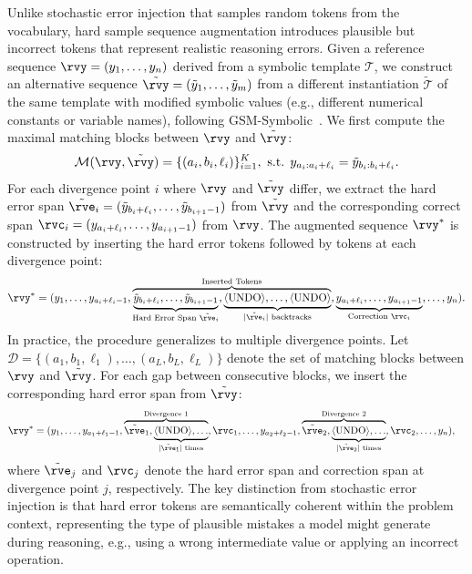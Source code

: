 Unlike stochastic error injection that samples random tokens from the vocabulary, hard sample sequence augmentation introduces plausible but incorrect tokens that represent realistic reasoning errors.
Given a reference sequence $\rvy = (y_1, \ldots, y_n)$ derived from a symbolic template $\mathcal{T}$, we construct an alternative sequence $\tilde{\rvy} = (\tilde{y}_1, \ldots, \tilde{y}_m)$ from a different instantiation $\tilde{\mathcal{T}}$ of the same template with modified symbolic values (e.g., different numerical constants or variable names), following GSM-Symbolic~\cite{mirzadeh2024gsm}.
We first compute the maximal matching blocks between $\rvy$ and $\tilde{\rvy}$:
\begin{align}
    \mathcal{M}(\rvy, \tilde{\rvy}) = \{(a_i, b_i, \ell_i)\}_{i=1}^{K}, \text{ s.t. } y_{a_i : a_i + \ell_i} = \tilde{y}_{b_i : b_i + \ell_i}.
\end{align}
For each divergence point $i$ where $\rvy$ and $\tilde{\rvy}$ differ, we extract the hard error span $\tilde{\rve}_i = (\tilde{y}_{b_i + \ell_i}, \ldots, \tilde{y}_{b_{i+1} - 1})$ from $\tilde{\rvy}$ and the corresponding correct span $\rvc_i = (y_{a_i + \ell_i}, \ldots, y_{a_{i+1} - 1})$ from $\rvy$.
The augmented sequence $\rvy^*$ is constructed by inserting the hard error tokens followed by tokens \bk at each divergence point:
\begin{align}
    \rvy^* = (y_1, \ldots, y_{a_i + \ell_i - 1}, \overbrace{\underbrace{\tilde{y}_{b_i + \ell_i}, \ldots, \tilde{y}_{b_{i+1} - 1}}_{\text{Hard Error Span } \tilde{\rve}_i}, \underbrace{\bk, \ldots, \bk}_{\text{$|\tilde{\rve}_i|$ backtracks}}}^{\text{Inserted Tokens}}, \underbrace{y_{a_i + \ell_i}, \ldots, y_{a_{i+1} - 1}}_{\text{Correction } \rvc_i}, \ldots, y_n).
\end{align}
In practice, the procedure generalizes to multiple divergence points. Let $\mathcal{D} = \{(a_1, b_1, \ell_1), \ldots, (a_L, b_L, \ell_L)\}$ denote the set of matching blocks between $\rvy$ and $\tilde{\rvy}$. For each gap between consecutive blocks, we insert the corresponding hard error span from $\tilde{\rvy}$:
\begin{align}
    \rvy^* = (&y_1, \ldots, y_{a_1 + \ell_1 - 1}, \overbrace{\tilde{\rve}_1, \underbrace{\bk, \ldots}_{\text{$|\tilde{\rve}_1|$ times}}}^{\text{Divergence 1}}, \rvc_1, \ldots, y_{a_2 + \ell_2 - 1}, \overbrace{\tilde{\rve}_2, \underbrace{\bk, \ldots}_{\text{$|\tilde{\rve}_2|$ times}}}^{\text{Divergence 2}}, \rvc_2, \ldots, y_n),
\end{align}
where $\tilde{\rve}_j$ and $\rvc_j$ denote the hard error span and correction span at divergence point $j$, respectively.
The key distinction from stochastic error injection is that hard error tokens are {semantically coherent} within the problem context, representing the type of plausible mistakes a model might generate during reasoning, e.g., using a wrong intermediate value or applying an incorrect operation.


